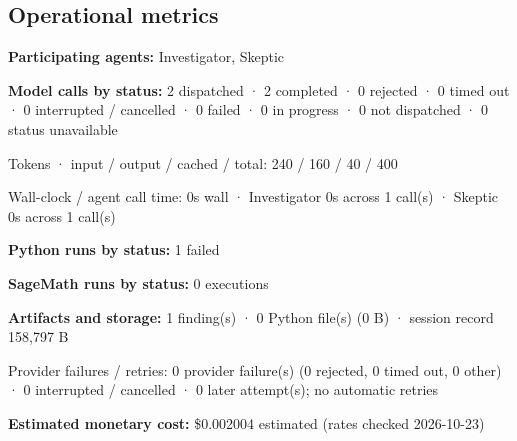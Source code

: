 \documentclass[11pt]{article}
\begin{document}
\subsection{Operational metrics}
\textbf{Participating agents:} Investigator, Skeptic\par
\textbf{Model calls by status:} 2 dispatched · 2 completed · 0 rejected · 0 timed out · 0 interrupted / cancelled · 0 failed · 0 in progress · 0 not dispatched · 0 status unavailable\par
Tokens · input / output / cached / total: 240 / 160 / 40 / 400\par
Wall-clock / agent call time: 0s wall · Investigator 0s across 1 call(s) · Skeptic 0s across 1 call(s)\par
\textbf{Python runs by status:} 1 failed\par
\textbf{SageMath runs by status:} 0 executions\par
\textbf{Artifacts and storage:} 1 finding(s) · 0 Python file(s) (0 B) · session record 158,797 B\par
Provider failures / retries: 0 provider failure(s) (0 rejected, 0 timed out, 0 other) · 0 interrupted / cancelled · 0 later attempt(s); no automatic retries\par
\textbf{Estimated monetary cost:} \$0.002004 estimated (rates checked 2026-10-23)\par
\end{document}
